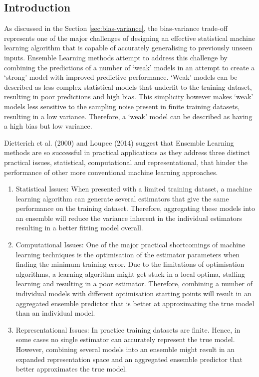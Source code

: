 \documentclass[../SMLreport_template.tex]{subfiles}
\begin{document}
\subsection{Introduction}
As discussed in the Section \ref{sec:bias-variance}, the bias-variance trade-off represents one of the major challenges of designing an effective statistical machine learning algorithm that is capable of accurately generalising to previously unseen inputs. Ensemble Learning methods attempt to address this challenge by combining the predictions of a number of ‘weak’ models in an attempt to create a ‘strong’ model with improved predictive performance. ‘Weak’ models can be described as less complex statistical models that underfit to the training dataset, resulting in poor predictions and high bias. This simplicity however makes ‘weak’ models less sensitive to the sampling noise present in finite training datasets, resulting in a low variance. Therefore, a ‘weak’ model can be described as having a high bias but low variance. \par\noindent

Dietterich et al. (2000) and Loupee (2014) suggest that Ensemble Learning methods are so successful in practical applications as they address three distinct practical issues, statistical, computational and representational, that hinder the performance of other more conventional machine learning approaches.

\begin{enumerate}
  \item Statistical Issues: When presented with a limited training dataset, a machine learning algorithm can generate several estimators that give the same performance on the training dataset. Therefore, aggregating these models into an ensemble will reduce the variance inherent in the individual estimators resulting in a better fitting model overall.
  
  \item Computational Issues: One of the major practical shortcomings of machine learning techniques is the optimisation of the estimator parameters when finding the minimum training error. Due to the limitations of optimisation algorithms, a learning algorithm might get stuck in a local optima, stalling learning and resulting in a poor estimator. Therefore, combining a number of individual models with different optimisation starting points will result in an aggregated ensemble predictor that is better at approximating the true model than an individual model.
  
  \item Representational Issues: In practice training datasets are finite. Hence, in some cases no single estimator can accurately represent the true model. However, combining several models into an ensemble might result in an expanded representation space and an aggregated ensemble predictor that better approximates the true model.
\end{enumerate}
\end{document}
